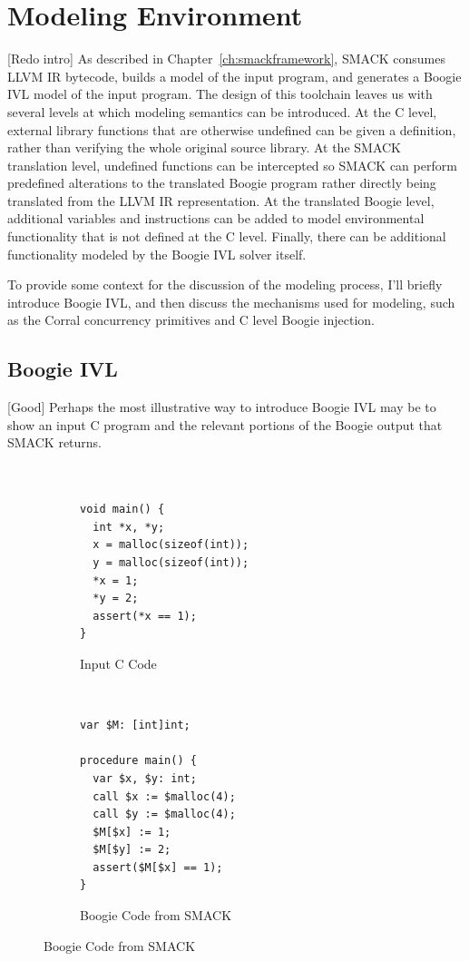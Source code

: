 \section{Modeling Environment}\label{sec:modelingenvironment}
[Redo intro]
As described in Chapter~\ref{ch:smackframework}, SMACK consumes LLVM IR
bytecode, builds a model of the input program, and generates a Boogie
IVL model of the input program.  The design of this toolchain leaves
us with several levels at which modeling semantics can be introduced.
At the C level, external library functions that are otherwise
undefined can be given a definition, rather than verifying the whole
original source library. At the SMACK translation level, undefined
functions can be intercepted so SMACK can perform predefined
alterations to the translated Boogie program rather directly being
translated from the LLVM IR representation.  At the translated Boogie
level, additional variables and instructions can be added to model
environmental functionality that is not defined at the C level.
Finally, there can be additional functionality modeled by the Boogie
IVL solver itself.

To provide some context for the discussion of the modeling process,
I'll briefly introduce Boogie IVL, and then discuss the mechanisms
used for modeling, such as the Corral concurrency primitives and C
level Boogie injection.

\subsection{Boogie IVL}
[Good]
Perhaps the most illustrative way to introduce Boogie IVL may be to
show an input C program and the relevant portions of the Boogie output
that SMACK returns.
\begin{figure}[h]
\centering
\caption{SMACK Translation of C Program}\label{fig:cToBoogie}
\begin{subfigure}[b]{.45\textwidth}
\centering
\caption{Input C Code}\label{fig:cToBoogie_a}
\begin{lstlisting}


void main() {
  int *x, *y;
  x = malloc(sizeof(int));
  y = malloc(sizeof(int));
  *x = 1;
  *y = 2;
  assert(*x == 1);
}
\end{lstlisting}
\end{subfigure}
~
\begin{subfigure}[b]{.45\textwidth}
\centering
\caption{Boogie Code from SMACK}\label{fig:cToBoogie_b}
\begin{lstlisting}[language=boogie]
var $M: [int]int;

procedure main() {
  var $x, $y: int;
  call $x := $malloc(4);
  call $y := $malloc(4);
  $M[$x] := 1;
  $M[$y] := 2;
  assert($M[$x] == 1);
}
\end{lstlisting}
\end{subfigure}
\end{figure}

